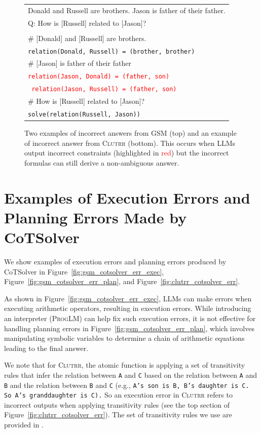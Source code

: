 \documentclass{article}
\theoremstyle{definition}
\newcommand\ttsmall[1]{\texttt{\small #1}}
\newcommand{\gsm}{\textsc{GSM}}
\newcommand{\clutrr}{\textsc{Clutrr}}
\newcommand{\pallm}{\textsc{ProgLM}}
\begin{document}
\begin{figure}[h]
\begin{tabularx}{\linewidth}{X}
Donald and Russell are brothers. Jason is father of their father.\\
Q: How is [Russell] related to [Jason]?  \\
\\
	\# [Donald] and [Russell] are brothers.\\
  \tt  relation(Donald, Russell) = (brother, brother)\\
    \# [Jason] is father of their father \\
 \tt   \textcolor{red}{relation(Jason, Donald) = (father, son) }\\
  \tt  \textcolor{red}{ relation(Jason, Russell) = (father, son)} \\
    \# How is [Russell] related to [Jason]? \\
  \tt  solve(relation(Russell, Jason))\\
    \bottomrule
    \end{tabularx}
    \caption{Two examples of incorrect answers from \gsm{} (top) and an example of incorrect answer from \clutrr{} (bottom). This occurs when LLMs output incorrect constraints (highlighted in \textcolor{red}{red}) but the incorrect formulas can still derive a non-ambiguous answer. }
    \label{fig:incorrect_answers}
\end{figure}

\newpage
\section{Examples of Execution Errors and Planning Errors Made by {\sc CoTSolver}}
\label{app:exs_cotsolver_errors}

We show examples of execution errors and planning errors produced by {\sc CoTSolver} in Figure~\ref{fig:gsm_cotsolver_err_exec}, Figure~\ref{fig:gsm_cotsolver_err_plan},  and Figure~\ref{fig:clutrr_cotsolver_err}.

As shown in Figure~\ref{fig:gsm_cotsolver_err_exec}, LLMs can make errors when executing arithmetic operators, resulting in execution errors. While introducing an interpreter (\pallm{}) can help fix such execution errors, it is not effective for handling planning errors in Figure~\ref{fig:gsm_cotsolver_err_plan}, which involves manipulating symbolic variables to determine a chain of arithmetic equations leading to the final answer.

We note that for \clutrr{}, the atomic function is applying a set of  transitivity rules that infer the relation between \ttsmall{A} and \ttsmall{C} based on the relation between \ttsmall{A} and \ttsmall{B} and the relation between  \ttsmall{B} and \ttsmall{C} (e.g., \ttsmall{A's son is B, B's daughter is C. So A's granddaughter is C).} So an execution error in \clutrr{} refers to incorrect outputs when applying transitivity rules (see the top section of Figure~\ref{fig:clutrr_cotsolver_err}). 
The set of transitivity rules we use are provided in \cite{faithfulcot,zhang2022improved}.
\end{document}
